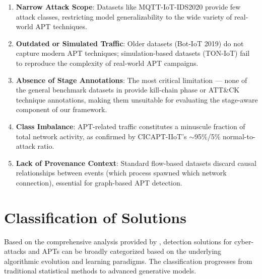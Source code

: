 \begin{enumerate}
    \item \textbf{Narrow Attack Scope}: Datasets like MQTT-IoT-IDS2020 provide few attack classes, restricting model generalizability to the wide variety of real-world APT techniques.
    \item \textbf{Outdated or Simulated Traffic}: Older datasets (Bot-IoT 2019) do not capture modern APT techniques; simulation-based datasets (TON-IoT) fail to reproduce the complexity of real-world APT campaigns.
    \item \textbf{Absence of Stage Annotations}: The most critical limitation --- none of the general benchmark datasets in \cite{ankalaki2025cyber} provide kill-chain phase or ATT\&CK technique annotations, making them unsuitable for evaluating the stage-aware component of our framework.
    \item \textbf{Class Imbalance}: APT-related traffic constitutes a minuscule fraction of total network activity, as confirmed by CICAPT-IIoT's $\sim$95\%/5\% normal-to-attack ratio.
    \item \textbf{Lack of Provenance Context}: Standard flow-based datasets discard causal relationships between events (which process spawned which network connection), essential for graph-based APT detection.
\end{enumerate}


\section{Classification of Solutions}
\label{sec:classification}

Based on the comprehensive analysis provided by \cite{ankalaki2025cyber}, detection solutions for cyber-attacks and APTs can be broadly categorized based on the underlying algorithmic evolution and learning paradigms. The classification progresses from traditional statistical methods to advanced generative models.

